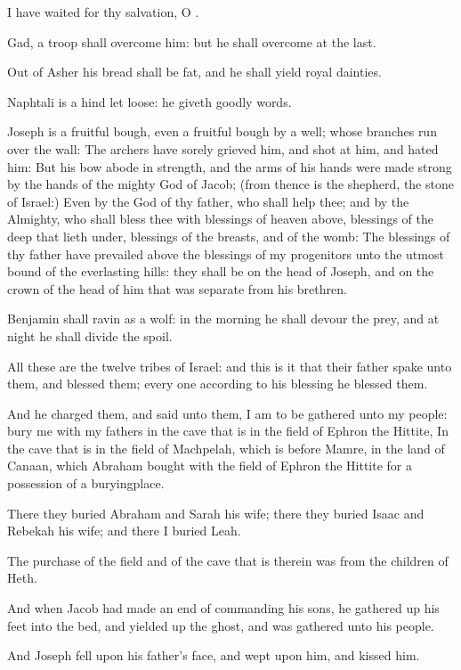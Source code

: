 \Verse I have waited for thy salvation, O \LORD.

\Verse Gad, a troop shall overcome him: but he shall overcome at the last.

\Verse Out of Asher his bread shall be fat, and he shall yield royal dainties.

\Verse Naphtali is a hind let loose: he giveth goodly words.

\Verse Joseph is a fruitful bough, even a fruitful bough by a well; whose branches run over the wall: \Verse The archers have sorely grieved him, and shot at him, and hated him: \Verse But his bow abode in strength, and the arms of his hands were made strong by the hands of the mighty God of Jacob; (from thence is the shepherd, the stone of Israel:) \Verse Even by the God of thy father, who shall help thee; and by the Almighty, who shall bless thee with blessings of heaven above, blessings of the deep that lieth under, blessings of the breasts, and of the womb: \Verse The blessings of thy father have prevailed above the blessings of my progenitors unto the utmost bound of the everlasting hills: they shall be on the head of Joseph, and on the crown of the head of him that was separate from his brethren.

\Verse Benjamin shall ravin as a wolf: in the morning he shall devour the prey, and at night he shall divide the spoil.

\Verse All these are the twelve tribes of Israel: and this is it that their father spake unto them, and blessed them; every one according to his blessing he blessed them.

\Verse And he charged them, and said unto them, I am to be gathered unto my people: bury me with my fathers in the cave that is in the field of Ephron the Hittite, \Verse In the cave that is in the field of Machpelah, which is before Mamre, in the land of Canaan, which Abraham bought with the field of Ephron the Hittite for a possession of a buryingplace.

\Verse There they buried Abraham and Sarah his wife; there they buried Isaac and Rebekah his wife; and there I buried Leah.

\Verse The purchase of the field and of the cave that is therein was from the children of Heth.

\Verse And when Jacob had made an end of commanding his sons, he gathered up his feet into the bed, and yielded up the ghost, and was gathered unto his people.

\Chapter
\Verse And Joseph fell upon his father's face, and wept upon him, and kissed him.

